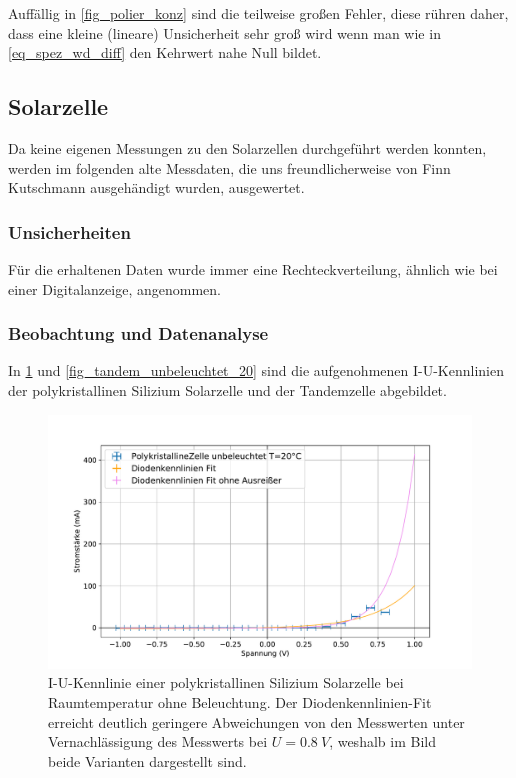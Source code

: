 \documentclass[
	a4paper,
	12pt,
	pagesize,
	ngerman
]{scrartcl}
\begin{document}
	Auffällig in \cref{fig_polier_konz} sind die teilweise großen Fehler, diese rühren daher, dass eine kleine (lineare) Unsicherheit sehr groß wird wenn man wie in \cref{eq_spez_wd_diff} den Kehrwert nahe Null bildet.

	\subsection{Solarzelle}

	Da keine eigenen Messungen zu den Solarzellen durchgeführt werden konnten, werden im folgenden alte Messdaten, die uns freundlicherweise von Finn Kutschmann ausgehändigt wurden, ausgewertet.
	\subsubsection{Unsicherheiten}
	Für die erhaltenen Daten wurde immer eine Rechteckverteilung, ähnlich wie bei einer Digitalanzeige, angenommen.
	\subsubsection{Beobachtung und Datenanalyse}

	In \cref{fig_poly_unbeleuchtet_20} und \cref{fig_tandem_unbeleuchtet_20} sind die aufgenohmenen I-U-Kennlinien der polykristallinen Silizium Solarzelle und der Tandemzelle abgebildet.

	\begin{figure}[H]
			\includegraphics[width=.9\linewidth]{img/PolykristallineZelle_unbeleuchtet_20.pdf}
			\caption{
				I-U-Kennlinie einer polykristallinen Silizium Solarzelle bei Raumtemperatur ohne Beleuchtung.
				Der Diodenkennlinien-Fit erreicht deutlich geringere Abweichungen von den Messwerten unter Vernachlässigung des Messwerts bei $U=\SI{0.8}{V}$, weshalb im Bild beide Varianten dargestellt sind.
								}
			\label{fig_poly_unbeleuchtet_20}
	\end{figure}
\end{document}
